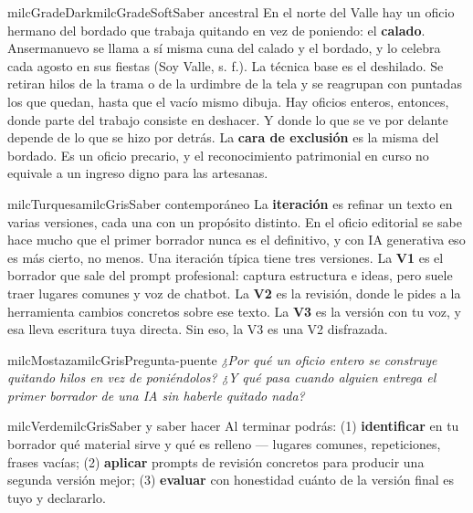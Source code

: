 \documentclass[11pt,letterpaper]{article}
\begin{document}
\begin{softbox}{milcGradeDark}{milcGradeSoft}{Saber ancestral}
En el norte del Valle hay un oficio hermano del bordado que trabaja quitando en vez de poniendo: el \textbf{calado}. Ansermanuevo se llama a sí misma cuna del calado y el bordado, y lo celebra cada agosto en sus fiestas (Soy Valle, s. f.). La técnica base es el deshilado. Se retiran hilos de la trama o de la urdimbre de la tela y se reagrupan con puntadas los que quedan, hasta que el vacío mismo dibuja. Hay oficios enteros, entonces, donde parte del trabajo consiste en deshacer. Y donde lo que se ve por delante depende de lo que se hizo por detrás. La \textbf{cara de exclusión} es la misma del bordado. Es un oficio precario, y el reconocimiento patrimonial en curso no equivale a un ingreso digno para las artesanas.\par{}
\end{softbox}

\begin{softbox}{milcTurquesa}{milcGris}{Saber contemporáneo}
La \textbf{iteración} es refinar un texto en varias versiones, cada una con un propósito distinto. En el oficio editorial se sabe hace mucho que el primer borrador nunca es el definitivo, y con IA generativa eso es más cierto, no menos. Una iteración típica tiene tres versiones. La \textbf{V1} es el borrador que sale del prompt profesional: captura estructura e ideas, pero suele traer lugares comunes y voz de chatbot. La \textbf{V2} es la revisión, donde le pides a la herramienta cambios concretos sobre ese texto. La \textbf{V3} es la versión con tu voz, y esa lleva escritura tuya directa. Sin eso, la V3 es una V2 disfrazada.
\end{softbox}

\begin{softbox}{milcMostaza}{milcGris}{Pregunta-puente}
\textit{¿Por qué un oficio entero se construye quitando hilos en vez de poniéndolos? ¿Y qué pasa cuando alguien entrega el primer borrador de una IA sin haberle quitado nada?}
\end{softbox}

\begin{softbox}{milcVerde}{milcGris}{Saber y saber hacer}
Al terminar podrás: (1) \textbf{identificar} en tu borrador qué material sirve y qué es relleno --- lugares comunes, repeticiones, frases vacías; (2) \textbf{aplicar} prompts de revisión concretos para producir una segunda versión mejor; (3) \textbf{evaluar} con honestidad cuánto de la versión final es tuyo y declararlo.
\end{softbox}
\end{document}
